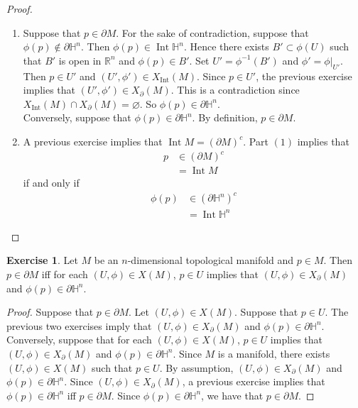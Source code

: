 \documentclass{book}
\theoremstyle{definition}
\newtheorem{ex}[definition]{Exercise}
\renewcommand{\H}{\mathbb{H}}
\newcommand{\R}{\mathbb{R}}
\DeclareMathOperator{\Int}{Int}
\DeclareMathOperator*{\0}{\mbf{0}}
\DeclareMathOperator*{\1}{\mbf{1}}
\newcommand{\p}{\partial}
\begin{document}
	\begin{proof}\
		\begin{enumerate}
			\item Suppose that $p \in \p M$. For the sake of contradiction, suppose that $\phi(p) \not \in \p \H^n$. Then $\phi(p) \in \Int \H^n$. Hence there exists $B' \subset \phi(U)$ such that $B'$ is open in $\R^n$ and $\phi(p) \in B'$. Set $U' = \phi^{-1}(B')$ and $\phi' = \phi|_{U'}$. Then $p \in U'$ and $(U', \phi') \in X_{\Int}(M)$. Since $p \in U'$, the previous exercise implies that $(U', \phi') \in X_{\p}(M)$. This is a contradiction since $X_{\Int}(M) \cap X_{\p}(M) = \varnothing$. So $\phi(p) \in \p \H^n$.\\
			Conversely, suppose that $\phi(p) \in \p \H^n$. By definition, $p \in \p M$.
			\item A previous exercise implies that $\Int M = (\p M)^c$. Part $(1)$ implies that 
			\begin{align*}
				p
				& \in (\p M)^c \\
				& = \Int M
			\end{align*}
			if and only if
			\begin{align*}
				\phi(p)
				& \in (\p \H^n)^c \\
				& = \Int \H^n
			\end{align*}
		\end{enumerate}
	\end{proof}

	\begin{ex}
		Let $M$ be an $n$-dimensional topological manifold and $p \in M$. Then $p \in \p M$ iff for each $(U, \phi) \in X(M)$, $p \in U$ implies that $(U, \phi) \in X_{\p}(M)$ and $\phi(p) \in \partial \H^n$. \\
	\end{ex}

	\begin{proof}
		Suppose that $p \in \partial M$. Let $(U, \phi) \in X(M)$. Suppose that $p \in U$. The previous two exercises imply that $(U, \phi) \in X_{\p}(M)$ and $\phi(p) \in \p \H^n$.\\
		Conversely, suppose that for each $(U, \phi) \in X(M)$, $p \in U$ implies that $(U, \phi) \in X_{\p}(M)$ and $\phi(p) \in \partial \H^n$. Since $M$ is a manifold, there exists $(U, \phi) \in X(M)$ such that $p \in U$. By assumption, $(U, \phi) \in X_{\p}(M)$ and $\phi(p) \in \p \H^n$. Since $(U, \phi) \in X_{\p}(M)$, a previous exercise implies that $\phi(p) \in \p \H^n$ iff $p \in \p M$. Since $\phi(p) \in \p \H^n$, we have that $p \in \p M$.
	\end{proof} 
	
\end{document}

